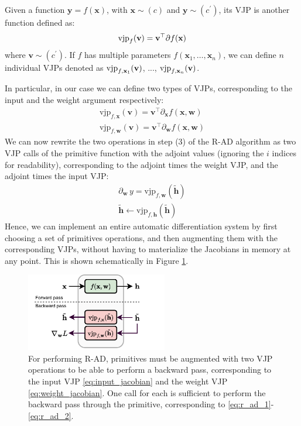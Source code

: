 \begin{definition} \addbottle
    Given a function $\mathbf{y}=f(\mathbf{x})$, with $\mathbf{x} \sim (c)$ and $\mathbf{y} \sim (c^\prime)$, its VJP is another function defined as:
    \begin{equation}
    \textnormal{vjp}_f(\mathbf{v})=\mathbf{v}^\top \partial f(\mathbf{x})
    \end{equation}
    where $\mathbf{v}\sim (c^\prime)$. If $f$ has multiple parameters $f(\mathbf{x}_1, \ldots, \mathbf{x}_n)$, we can define $n$ individual VJPs denoted as $\textnormal{vjp}_{f,\mathbf{x}_1}(\mathbf{v})$, ..., $\textnormal{vjp}_{f, \mathbf{x}_n}(\mathbf{v})$.
\end{definition}

In particular, in our case we can define two types of VJPs, corresponding to the input and the weight argument respectively:
%
\begin{gather}
\text{vjp}_{f,\mathbf{x}}(\mathbf{v})=\mathbf{v}^\top\partial_\mathbf{x}f(\mathbf{x},\mathbf{w}) \label{eq:input_jacobian}\\ \text{vjp}_{f, \mathbf{w}}(\mathbf{v})=\mathbf{v}^\top\partial_\mathbf{w}f(\mathbf{x},\mathbf{w})\label{eq:weight_jacobian}
\end{gather}
%
We can now rewrite the two operations in step (3) of the R-AD algorithm as two VJP calls of the primitive function with the adjoint values (ignoring the $i$ indices for readability), corresponding to the adjoint times the weight VJP, and the adjoint times the input VJP:
%
\begin{gather}
\partial_{\mathbf{w}} \, y = \text{vjp}_{f,\mathbf{w}}\left(\widetilde{\mathbf{h}}\right) \label{eq:r_ad_1}\\ \widetilde{\mathbf{h}}  \gets \text{vjp}_{f, \mathbf{h}}\left(\widetilde{\mathbf{h}}\right) \label{eq:r_ad_2}
\end{gather}
%
Hence, we can implement an entire automatic differentiation system by first choosing a set of primitives operations, and then augmenting them with the corresponding VJPs, without having to materialize the Jacobians in memory at any point. This is shown schematically in Figure \ref{fig:backward_pass}. 

\begin{figure}
    \centering
    \includegraphics[width=0.55\textwidth]{images/backward_pass-Pagina-2.pdf}
    \caption{For performing R-AD, primitives must be augmented with two VJP operations to be able to perform a backward pass, corresponding to the input VJP \eqref{eq:input_jacobian} and the weight VJP \eqref{eq:weight_jacobian}. One call for each is sufficient to perform the backward pass through the primitive, corresponding to \eqref{eq:r_ad_1}-\eqref{eq:r_ad_2}.}
    \label{fig:backward_pass}
\end{figure}

